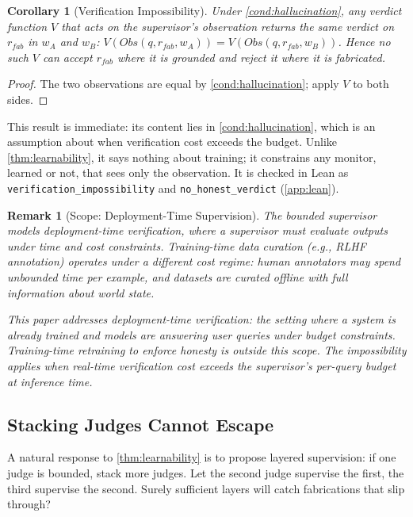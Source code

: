 \documentclass[11pt]{article}
\newtheorem{corollary}[theorem]{Corollary}
\newtheorem{remark}{Remark}
\begin{document}
\begin{corollary}[Verification Impossibility]\label{cor:verification}
Under \autoref{cond:hallucination}, any verdict function $V$ that acts on the
supervisor's observation returns the same verdict on $r_{fab}$ in $w_A$ and
$w_B$: $V(Obs(q, r_{fab}, w_A)) = V(Obs(q, r_{fab}, w_B))$. Hence no such $V$
can accept $r_{fab}$ where it is grounded and reject it where it is fabricated.
\end{corollary}

\begin{proof}
The two observations are equal by \autoref{cond:hallucination}; apply $V$ to
both sides.
\end{proof}

This result is immediate: its content lies in \autoref{cond:hallucination},
which is an assumption about when verification cost exceeds the budget. Unlike
\autoref{thm:learnability}, it says nothing about training; it constrains any
monitor, learned or not, that sees only the observation. It is checked in Lean
as \texttt{verification\_impossibility} and \texttt{no\_honest\_verdict}
(\autoref{app:lean}).

\begin{remark}[Scope: Deployment-Time Supervision]
The bounded supervisor models \emph{deployment-time} verification, where a
supervisor must evaluate outputs under time and cost constraints. Training-time
data curation (e.g., RLHF annotation) operates under a different cost regime:
human annotators may spend unbounded time per example, and datasets are curated
offline with full information about world state.

This paper addresses deployment-time verification: the setting where a system is
already trained and models are answering user queries under budget constraints.
Training-time retraining to enforce honesty is outside this scope. The
impossibility applies when real-time verification cost exceeds the supervisor's
per-query budget at inference time.
\end{remark}

\subsection{Stacking Judges Cannot Escape}

A natural response to \autoref{thm:learnability} is to propose layered
supervision: if one judge is bounded, stack more judges. Let the second judge
supervise the first, the third supervise the second. Surely sufficient layers
will catch fabrications that slip through?
\end{document}
